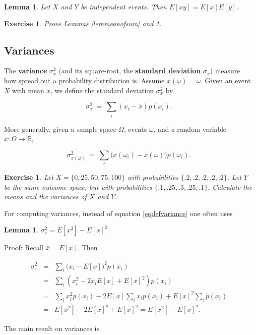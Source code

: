 \documentclass[12pt,letterpaper]{report}
\newcommand\be{\begin{equation}}
\newcommand\ee{\end{equation}}
\newcommand\bea{\begin{eqnarray}}
\newcommand\eea{\end{eqnarray}}
\newcommand{\R}{\ensuremath{\mathbb{R}}}
\newtheorem{lem}[thm]{Lemma}
\newtheorem{exe}[thm]{Exercise}
\begin{document}
\begin{lem}\label{lemmeanofproduct} Let $X$ and $Y$ be independent
events. Then $E[xy] = E[x]E[y]$.
\end{lem}

\begin{exe} Prove Lemmas \ref{lemmeanofsum} and
\ref{lemmeanofproduct}. \end{exe}


\subsection{Variances}

The \textbf{variance} $\sigma^2_x$ (and its square-root, the
\textbf{standard deviation} $\sigma_x$) measure how spread out a
probability distribution is. Assume $x(\omega) = \omega$. Given an
event $X$ with mean $\bar{x}$, we define the standard deviation
$\sigma^2_x$ by

\be\label{eqdefvariance}  \sigma^2_x \ = \ \sum_i (x_i -
\bar{x})p(x_i). \ee

More generally, given a sample space $\Omega$, events $\omega$,
and a random variable $x:\Omega \rightarrow \R$,

\be \sigma^2_{x(\omega)} \ = \ \sum_i \Big( x(\omega_i) -
\bar{x}(\omega) \Big) p(\omega_i). \ee

\begin{exe} Let $X = \{0, 25, 50, 75, 100\}$ with probabilities
$\{.2, .2, .2, .2, .2\}$. Let $Y$ be the same outcome space, but
with probabilities $\{.1, .25, .3, .25, .1\}$. Calculate the means
and the variances of $X$ and $Y$.
\end{exe}

For computing variances, instead of equation \ref{eqdefvariance}
one often uses

\begin{lem} $\sigma^2_x = E[x^2] - E[x]^2$. \end{lem}

Proof: Recall $\bar{x} = E[x]$. Then

\bea \sigma^2_x & = & \sum_i \Big(x_i - E[x]\Big)^2 p(x_i)
\nonumber\\ & = & \sum_i (x_i^2 - 2 x_i E[x] +  E[x]^2) p(x_i)
\nonumber\\ & = & \sum_i x_i^2 p(x_i) - 2E[x]\sum_i x_i p(x_i) +
E[x]^2 \sum_i p(x_i) \nonumber\\ &=& E[x^2] - 2E[x]^2 + E[x]^2 =
E[x^2] - E[x]^2. \eea

The main result on variances is
\end{document}
